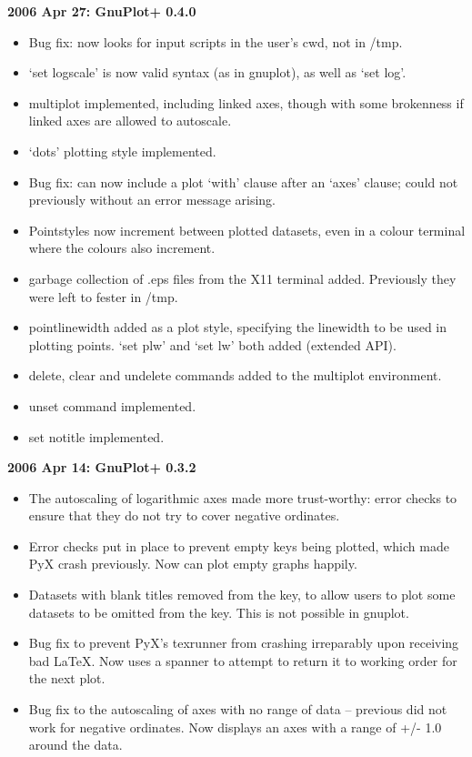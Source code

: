 \documentclass[a4paper,onecolumn,11pt]{book}
\begin{document}
\noindent \textbf{2006 Apr 27: GnuPlot+ 0.4.0}
\begin{itemize}
\item Bug fix: now looks for input scripts in the user's cwd, not in /tmp.
\item `set logscale' is now valid syntax (as in gnuplot), as well as `set log'.
\item multiplot implemented, including linked axes, though with some brokenness
if linked axes are allowed to autoscale.
\item `dots' plotting style implemented.
\item Bug fix: can now include a plot `with' clause after an `axes' clause;
could not previously without an error message arising.
\item Pointstyles now increment between plotted datasets, even in a colour
terminal where the colours also increment.
\item garbage collection of .eps files from the X11 terminal added. Previously
they were left to fester in /tmp.
\item pointlinewidth added as a plot style, specifying the linewidth to be used
in plotting points. `set plw' and `set lw' both added (extended API).
\item delete, clear and undelete commands added to the multiplot environment.
\item unset command implemented.
\item set notitle implemented.
\end{itemize}

\noindent \textbf{2006 Apr 14: GnuPlot+ 0.3.2}
\begin{itemize}
\item The autoscaling of logarithmic axes made more trust-worthy: error checks
to ensure that they do not try to cover negative ordinates.
\item Error checks put in place to prevent empty keys being plotted, which made
PyX crash previously. Now can plot empty graphs happily.
\item Datasets with blank titles removed from the key, to allow users to plot
some datasets to be omitted from the key. This is not possible in gnuplot.
\item Bug fix to prevent PyX's texrunner from crashing irreparably upon
receiving bad LaTeX. Now uses a spanner to attempt to return it to working
order for the next plot.
\item Bug fix to the autoscaling of axes with no range of data -- previous did
not work for negative ordinates. Now displays an axes with a range of +/-
1.0 around the data.
\end{itemize}
\end{document}
